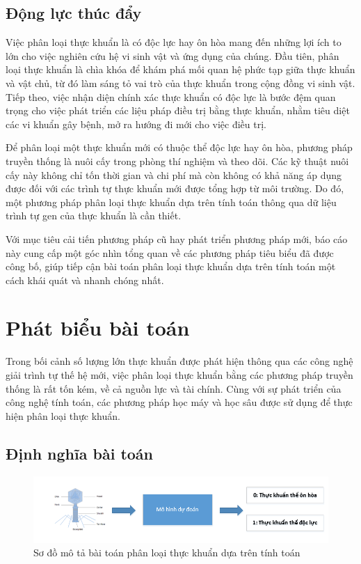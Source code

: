 \subsection{Động lực thúc đẩy}

Việc phân loại thực khuẩn là có độc lực hay ôn hòa mang đến những lợi ích to lớn cho việc nghiên cứu hệ vi sinh vật và ứng dụng của chúng. Đầu tiên, phân loại thực khuẩn là chìa khóa để khám phá mối quan hệ phức tạp giữa thực khuẩn và vật chủ, từ đó làm sáng tỏ vai trò của thực khuẩn trong cộng đồng vi sinh vật. Tiếp theo, việc nhận diện chính xác thực khuẩn có độc lực là bước đệm quan trọng cho việc phát triển các liệu pháp điều trị bằng thực khuẩn, nhằm tiêu diệt các vi khuẩn gây bệnh, mở ra hướng đi mới cho việc điều trị.

Để phân loại một thực khuẩn mới có thuộc thể độc lực hay ôn hòa, phương pháp truyền thống là nuôi cấy trong phòng thí nghiệm và theo dõi. Các kỹ thuật nuôi cấy này không chỉ tốn thời gian và chi phí mà còn không có khả năng áp dụng được đối với các trình tự thực khuẩn mới được tổng hợp từ môi trường. Do đó, một phương pháp phân loại thực khuẩn dựa trên tính toán thông qua dữ liệu trình tự gen của thực khuẩn là cần thiết.

Với mục tiêu cải tiến phương pháp cũ hay phát triển phương pháp mới, báo cáo này cung cấp một góc nhìn tổng quan về các phương pháp tiêu biểu đã được công bố, giúp tiếp cận bài toán phân loại thực khuẩn dựa trên tính toán một cách khái quát và nhanh chóng nhất.

\section{Phát biểu bài toán}

Trong bối cảnh số lượng lớn thực khuẩn được phát hiện thông qua các công nghệ giải trình tự thế hệ mới, việc phân loại thực khuẩn bằng các phương pháp truyền thống là rất tốn kém, về cả nguồn lực và tài chính. Cùng với sự phát triển của công nghệ tính toán, các phương pháp học máy và học sâu được sử dụng để thực hiện phân loại thực khuẩn.

\subsection{Định nghĩa bài toán}
\begin{figure}[H]
    \centering
    \includegraphics[width=1\linewidth]{figures/problem.png}
    \caption{Sơ đồ mô tả bài toán phân loại thực khuẩn dựa trên tính toán}
    \label{fig:problem}
\end{figure}

